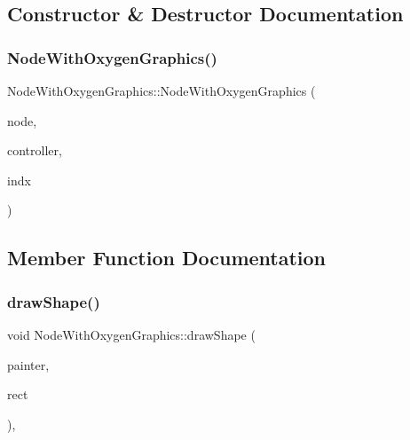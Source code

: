 \subsection{Constructor \& Destructor Documentation}
\mbox{\label{class_node_with_oxygen_graphics_ab73b30626b6cd82f087b88f30b8ae958}} 
\subsubsection{\texorpdfstring{NodeWithOxygenGraphics()}{NodeWithOxygenGraphics()}}
{\footnotesize\ttfamily Node\+With\+Oxygen\+Graphics\+::\+Node\+With\+Oxygen\+Graphics (\begin{DoxyParamCaption}\item[{\mbox{\hyperlink{class_node_data}{Node\+Data}} $\ast$}]{node,  }\item[{\mbox{\hyperlink{class_map_objects_controller}{Map\+Objects\+Controller}} $\ast$}]{controller,  }\item[{int}]{indx }\end{DoxyParamCaption})\hspace{0.3cm}{\ttfamily [inline]}}



\subsection{Member Function Documentation}
\mbox{\label{class_node_with_oxygen_graphics_a173de15e8ae7e2f1a22c2075e67f03f6}} 
\subsubsection{\texorpdfstring{drawShape()}{drawShape()}}
{\footnotesize\ttfamily void Node\+With\+Oxygen\+Graphics\+::draw\+Shape (\begin{DoxyParamCaption}\item[{Q\+Painter \&}]{painter,  }\item[{const qmapcontrol\+::\+Rect\+World\+Px \&}]{rect }\end{DoxyParamCaption})\hspace{0.3cm}{\ttfamily [protected]}, {\ttfamily [virtual]}}



